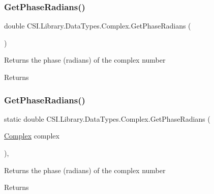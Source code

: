 \subsubsection{\texorpdfstring{GetPhaseRadians()}{GetPhaseRadians()}\hspace{0.1cm}{\footnotesize\ttfamily [1/2]}}
{\footnotesize\ttfamily double C\+S\+I.\+Library.\+Data\+Types.\+Complex.\+Get\+Phase\+Radians (\begin{DoxyParamCaption}{ }\end{DoxyParamCaption})\hspace{0.3cm}{\ttfamily [inline]}}



Returns the phase (radians) of the complex number 

\begin{DoxyReturn}{Returns}

\end{DoxyReturn}
\mbox{\label{struct_c_s_i_1_1_library_1_1_data_types_1_1_complex_a2984f22ff552ffa68f13f2b3d0d89ecc}} 
\subsubsection{\texorpdfstring{GetPhaseRadians()}{GetPhaseRadians()}\hspace{0.1cm}{\footnotesize\ttfamily [2/2]}}
{\footnotesize\ttfamily static double C\+S\+I.\+Library.\+Data\+Types.\+Complex.\+Get\+Phase\+Radians (\begin{DoxyParamCaption}\item[{\mbox{\hyperlink{struct_c_s_i_1_1_library_1_1_data_types_1_1_complex}{Complex}}}]{complex }\end{DoxyParamCaption})\hspace{0.3cm}{\ttfamily [inline]}, {\ttfamily [static]}}



Returns the phase (radians) of the complex number 

\begin{DoxyReturn}{Returns}

\end{DoxyReturn}
\mbox{\label{struct_c_s_i_1_1_library_1_1_data_types_1_1_complex_a3609090c64694f12e1452ecab047f549}} 
